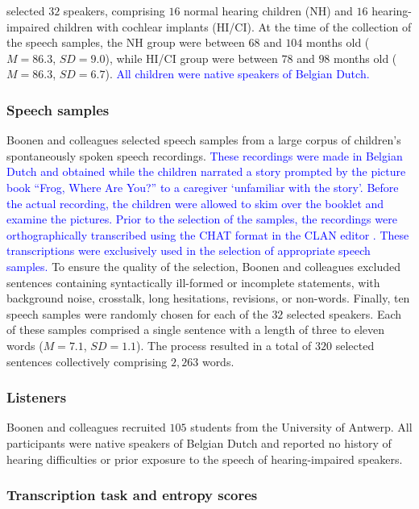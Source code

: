 \documentclass[
  authoryear,
  preprint,
  1p]{elsarticle}
\begin{document}
\citet{Boonen_et_al_2023} selected \(32\) speakers, comprising \(16\)
normal hearing children (NH) and \(16\) hearing-impaired children with
cochlear implants (HI/CI). At the time of the collection of the speech
samples, the NH group were between \(68\) and \(104\) months old
(\(M=86.3\), \(SD=9.0\)), while HI/CI group were between \(78\) and
\(98\) months old (\(M=86.3\), \(SD=6.7\)). \textcolor{blue}{All children were native
speakers of Belgian Dutch.}

\subsubsection{Speech samples}\label{sec-M-SS}

Boonen and colleagues selected speech samples from a large corpus of
children's spontaneously spoken speech recordings. \textcolor{blue}{These recordings
were made in Belgian Dutch and obtained while the children narrated a
story prompted by the picture book ``Frog, Where Are You?''
\citep{Mayer_1969} to a caregiver `unfamiliar with the story'. Before
the actual recording, the children were allowed to skim over the booklet
and examine the pictures. Prior to the selection of the samples, the
recordings were orthographically transcribed using the CHAT format in
the CLAN editor \citep{MacWhinney_2020}. These transcriptions were
exclusively used in the selection of appropriate speech samples.} To
ensure the quality of the selection, Boonen and colleagues excluded
sentences containing syntactically ill-formed or incomplete statements,
with background noise, crosstalk, long hesitations, revisions, or
non-words. Finally, ten speech samples were randomly chosen for each of
the \(32\) selected speakers. Each of these samples comprised a single
sentence with a length of three to eleven words (\(M=7.1\), \(SD=1.1\)).
The process resulted in a total of \(320\) selected sentences
collectively comprising \(2,263\) words.

\subsubsection{Listeners}\label{sec-M-L}

Boonen and colleagues recruited \(105\) students from the University of
Antwerp. All participants were native speakers of Belgian Dutch and
reported no history of hearing difficulties or prior exposure to the
speech of hearing-impaired speakers.

\subsubsection{Transcription task and entropy scores}\label{sec-M-TS}
\end{document}
